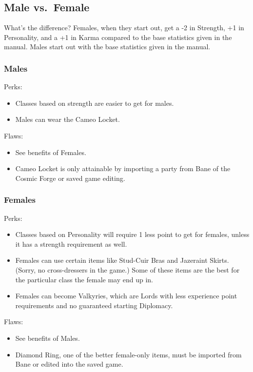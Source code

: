 \documentclass[12pt]{article}
\providecommand{\tightlist}{%
  \setlength{\itemsep}{0pt}\setlength{\parskip}{0pt}}
\newcommand{\WviiTwoColumnSetup}{\raggedcolumns\RaggedRight}
\begin{document}
\subsection{Male vs.~Female}\label{male-vs.female}

What's the difference? Females, when they start out, get a -2 in
Strength, +1 in Personality, and a +1 in Karma compared to the base
statistics given in the manual. Males start out with the base statistics
given in the manual.

\subsubsection{Males}\label{males}

\begin{multicols}{2}\WviiTwoColumnSetup
Perks:

\begin{itemize}
\tightlist
\item
  Classes based on strength are easier to get for males.
\item
  Males can wear the Cameo Locket.
\end{itemize}
\columnbreak

Flaws:

\begin{itemize}
\item
  See benefits of Females.
\item
  Cameo Locket is only attainable by importing a party from Bane of the
  Cosmic Forge or saved game editing.
\end{itemize}
\end{multicols}

\subsubsection{Females}\label{females}

\begin{multicols}{2}\WviiTwoColumnSetup
Perks:

\begin{itemize}
\tightlist
\item
  Classes based on Personality will require 1 less point to get for
  females, unless it has a strength requirement as well.
\item
  Females can use certain items like Stud-Cuir Bras and Jazeraint
  Skirts. (Sorry, no cross-dressers in the game.) Some of these items
  are the best for the particular class the female may end up in.
\item
  Females can become Valkyries, which are Lords with less experience
  point requirements and no guaranteed starting Diplomacy.
\end{itemize}
\columnbreak

Flaws:

\begin{itemize}
\item
  See benefits of Males.
\item
  Diamond Ring, one of the better female-only items, must be imported
  from Bane or edited into the saved game.
\end{itemize}
\end{multicols}
\end{document}
